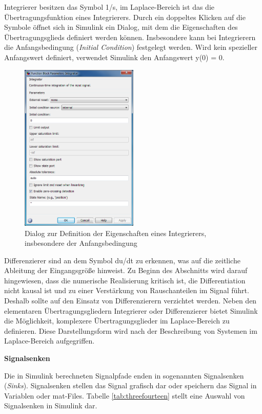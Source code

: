\noindent Integrierer besitzen das Symbol 1/s, im Laplace-Bereich ist das die Übertragungsfunktion eines Integrierers. Durch ein doppeltes Klicken auf die Symbole öffnet sich in Simulink ein Dialog, mit dem die Eigenschaften des Übertragungsglieds definiert werden können. Insbesondere kann bei Integrierern die Anfangsbedingung (\textit{Initial Condition}) festgelegt werden. Wird kein spezieller Anfangswert definiert, verwendet Simulink den Anfangswert y(0) = 0.
\clearpage
\begin{figure}[H]
  \centerline{\includegraphics[width=0.5\textwidth]{Kapitel2/Bilder/image34}}
  \caption{Dialog zur Definition der Eigenschaften eines Integrierers, insbesondere der Anfangsbedingung}
  \label{fig:DialogAnfangsbedingung}
\end{figure}

\noindent Differenzierer sind an dem Symbol du/dt zu erkennen, was auf die zeitliche Ableitung der Eingangsgröße hinweist. Zu Beginn des Abschnitts wird darauf hingewiesen, dass die numerische Realisierung kritisch ist, die Differentiation nicht kausal ist und zu einer Verstärkung von Rauschanteilen im Signal führt. Deshalb sollte auf den Einsatz von Differenzierern verzichtet werden.
Neben den elementaren Übertragungsgliedern Integrierer oder Differenzierer bietet Simulink die Möglichkeit, komplexere Übertragungsglieder im Laplace-Bereich zu definieren. Diese Darstellungsform wird nach der Beschreibung von Systemen im Laplace-Bereich aufgegriffen.

\medskip

{\selectfont
\noindent\textbf{Signalsenken}}

\noindent Die in Simulink berechneten Signalpfade enden in sogenannten Signalsenken (\textit{Sinks}). Signalsenken stellen das Signal grafisch dar oder speichern das Signal in Variablen oder mat-Files. Tabelle \ref{tab:threefourteen} stellt eine Auswahl von Signalsenken in Simulink dar.


